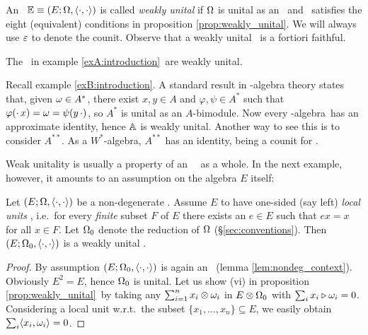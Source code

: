 \begin{defn}  \label{def:weakly_unital}
   An \context\ $\mathbb{E} \equiv (E; \Omega, \langle\cdot, \cdot\rangle)$ is called {\em weakly unital\/} if
   $\Omega$ is unital as an \Ebimod\ and \EE\ satisfies the eight (equivalent)
   conditions in proposition \ref{prop:weakly_unital}\@.
   We will always use $\varepsilon$ to denote the counit.
   Observe that a weakly unital \context\ is a fortiori faithful.
\end{defn}


\begin{exA} \rm
  The \contexts\ in example \ref{exA:introduction}\ are weakly unital.
\end{exA}


\begin{exB}  \rm
  Recall example \ref{exB:introduction}\@. A standard result in \Cstar-algebra theory
  states that, given $\omega \in A^*$, there exist $x,y \in A$ and $\varphi, \psi \in A^*$
  such that $\varphi(\cdot\, x) = \omega = \psi(y\,\cdot)$,
  so $A^*$ is unital as an $A$-bimodule.
  Now every \mbox{\Cstar-algebra}\ has an approximate identity, hence
  $\mathbb{A}$ is weakly unital.
  Another way to see this is to consider $A^{**}$.
  As a $W^*$-algebra, $A^{**}$ has an identity, being a counit for \Aa\@.
\end{exB}

{\small
Weak unitality is usually a property of an \context\ \EOP\ as a whole.
In the next example, however, it amounts to an %
assumption on the algebra $E$ itself:}

\begin{ex}  \rm
  Let $(E; \Omega, \langle\cdot, \cdot\rangle)$ be a non-degenerate \context\@. Assume $E$ to have
  one-sided (say left) {\em local units\/} \cite{FonsDraZhang:actions,Kust:corep},
  i.e.\ for every {\em finite\/} subset $F$ of $E$ there exists an $e\in E$ such that
  $ex=x$ for all $x\in F$. Let $\Omega_0$ denote the reduction of $\Omega$ (\S \ref{sec:conventions}).
  Then $(E; \Omega_0, \langle\cdot, \cdot\rangle)$ is a weakly unital \context.
\end{ex}
\begin{proof}
  By assumption $(E; \Omega_0, \langle\cdot, \cdot\rangle)$ is again an \context\ (lemma \ref{lem:nondeg_context}).
  Obviously $E^2=E$, hence $\Omega_0$ is unital.
  Let us show (vi) in proposition \ref{prop:weakly_unital}\ by taking any
  $\sum_{i=1}^n x_i\otimes\omega_i$ in $E\otimes\Omega_0$ with $\sum_i  x_i\triangleright\omega_i = 0$.
  Considering a local unit w.r.t.\ the subset $\{x_1, \ldots, x_n \} \subseteq E$,
  we easily obtain $\sum_i \langle x_i,\omega_i \rangle = 0$.
\end{proof}


